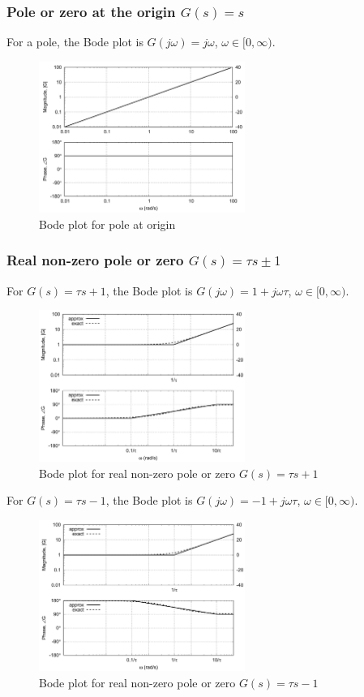 \documentclass[letterpaper,12pt]{article}
\begin{document}
\subsubsection{Pole or zero at the origin $G(s) = s$}
For a pole, the Bode plot is $G(j \omega) = j\omega$, $\omega \in [0, \infty)$.
\begin{figure}[h]
    \centering
    \includegraphics[width=0.6\textwidth]{case3 pole or zero at origin.png}
    \caption{Bode plot for pole at origin}
\end{figure}
\FloatBarrier

\subsubsection{Real non-zero pole or zero $G(s) = \tau s \pm 1$}
For $G(s) = \tau s + 1$, the Bode plot is $G(j \omega) = 1 + j\omega \tau$, $\omega \in [0, \infty)$.
\begin{figure}[h]
    \centering
    \includegraphics[width=0.6\textwidth]{case4 real nonzero root negative.png}
    \caption{Bode plot for real non-zero pole or zero $G(s) = \tau s + 1$}
\end{figure}

For $G(s) = \tau s - 1$, the Bode plot is $G(j \omega) = -1 + j\omega \tau$, $\omega \in [0, \infty)$.
\begin{figure}[h]
    \centering
    \includegraphics[width=0.6\textwidth]{case5 real nonzero root positive.png}
    \caption{Bode plot for real non-zero pole or zero $G(s) = \tau s - 1$}
\end{figure}
\FloatBarrier
\end{document}
